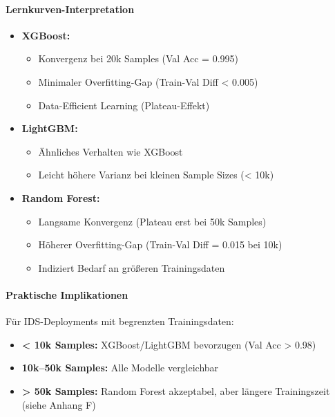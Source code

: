 \documentclass[11pt,a4paper]{article}
\begin{document}
    \paragraph{Lernkurven-Interpretation}
    \begin{itemize}
        \item \textbf{XGBoost:} 
        \begin{itemize}
            \item Konvergenz bei 20k Samples (Val Acc = 0.995)
            \item Minimaler Overfitting-Gap (Train-Val Diff < 0.005)
            \item Data-Efficient Learning (Plateau-Effekt)
        \end{itemize}
        \item \textbf{LightGBM:} 
        \begin{itemize}
            \item Ähnliches Verhalten wie XGBoost
            \item Leicht höhere Varianz bei kleinen Sample Sizes (< 10k)
        \end{itemize}
        \item \textbf{Random Forest:} 
        \begin{itemize}
            \item Langsame Konvergenz (Plateau erst bei 50k Samples)
            \item Höherer Overfitting-Gap (Train-Val Diff = 0.015 bei 10k)
            \item Indiziert Bedarf an größeren Trainingsdaten
        \end{itemize}
    \end{itemize}

    \paragraph{Praktische Implikationen}
    Für IDS-Deployments mit begrenzten Trainingsdaten:
    \begin{itemize}
        \item \textbf{< 10k Samples:} XGBoost/LightGBM bevorzugen 
        (Val Acc > 0.98)
        \item \textbf{10k--50k Samples:} Alle Modelle vergleichbar
        \item \textbf{> 50k Samples:} Random Forest akzeptabel, 
        aber längere Trainingszeit (siehe Anhang F)
    \end{itemize}
\end{document}
